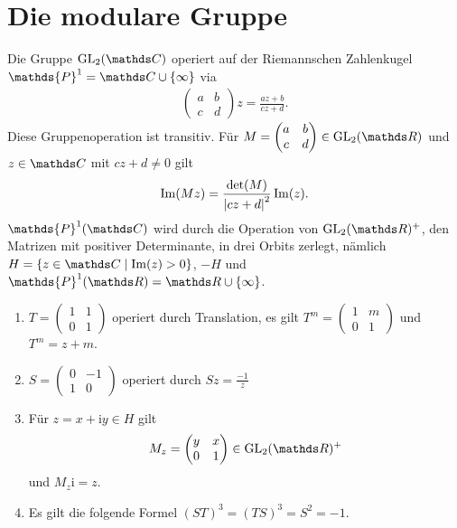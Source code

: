 \chapter{Die modulare Gruppe}

Die Gruppe $\GL_2(\C)$ operiert auf der Riemannschen Zahlenkugel
$\mathds{P}^1=\C \cup \{\infty\}$
via
\begin{align*}
\begin{pmatrix}
a&b\\
c&d
\end{pmatrix} z=\frac{az+b}{cz+d}.
\end{align*}
Diese Gruppenoperation ist transitiv.
Für $M=\begin{pmatrix}
a&b\\
c&d
\end{pmatrix} \in \GL_2(\R)$ und $z \in \C$ mit $cz+d\not =0$ gilt
\begin{align*}
\operatorname{Im}(Mz)=\frac{\det(M)}{\left\vert cz+d\right\vert^2}\operatorname{Im}(z).
\end{align*}
$\mathds{P}^1(\C)$ wird durch die Operation von $\GL_2(\R)^+$, den Matrizen mit positiver Determinante, in drei Orbits zerlegt, nämlich
$H=\{z\in \C \mid \Imt(z)>0\}$, $-H$ und $\mathds{P}^1(\R)=\R\cup \{\infty\}$.

\begin{bsp}
\begin{enumerate}[label=(\roman*)]
\item $T=\begin{pmatrix}
1&1\\
0&1
\end{pmatrix}$ operiert durch Translation, es gilt $T^m=\begin{pmatrix}
1&m\\
0&1
\end{pmatrix}$
und $T^m=z+m$.
\item $S=\begin{pmatrix}
0&-1\\
1&0
\end{pmatrix}$ operiert durch $Sz=\frac{-1}{z}$
\item Für $z=x+\mathrm{i}y\in H$ gilt
\begin{align*}
M_z=\begin{pmatrix}
y&x\\
0&1
\end{pmatrix} \in \GL_2(\R)^+
\end{align*}
und $M_z \mathrm{i}=z$.
\item Es gilt die folgende Formel $(ST)^3=(TS)^3=S^2=-1$.
\end{enumerate}
\end{bsp}

